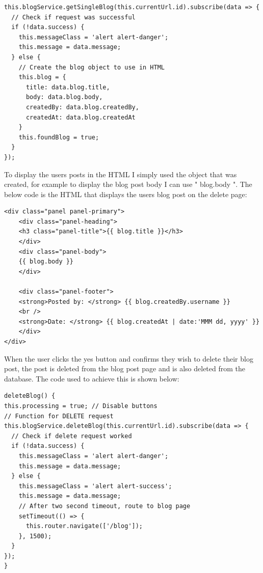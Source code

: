 \begin{lstlisting}
this.blogService.getSingleBlog(this.currentUrl.id).subscribe(data => {
  // Check if request was successful
  if (!data.success) {
    this.messageClass = 'alert alert-danger'; 
    this.message = data.message; 
  } else {
    // Create the blog object to use in HTML
    this.blog = {
      title: data.blog.title,
      body: data.blog.body,
      createdBy: data.blog.createdBy,
      createdAt: data.blog.createdAt
    }
    this.foundBlog = true;
  }
});
\end{lstlisting}

To display the users posts in the HTML I simply used the object that was created, for example to display the blog post body I can use "{{ blog.body }}". The below code is the HTML that displays the users blog post on the delete page:
\begin{lstlisting}
<div class="panel panel-primary">
    <div class="panel-heading">
    <h3 class="panel-title">{{ blog.title }}</h3>
    </div>
    <div class="panel-body">
    {{ blog.body }}
    </div>

    <div class="panel-footer">
    <strong>Posted by: </strong> {{ blog.createdBy.username }}
    <br />
    <strong>Date: </strong> {{ blog.createdAt | date:'MMM dd, yyyy' }}
    </div>
</div>
\end{lstlisting}

When the user clicks the yes button and confirms they wish to delete their blog post, the post is deleted from the blog post page and is also deleted from the database. The code used to achieve this is shown below:

\begin{lstlisting}
deleteBlog() {
this.processing = true; // Disable buttons
// Function for DELETE request
this.blogService.deleteBlog(this.currentUrl.id).subscribe(data => {
  // Check if delete request worked
  if (!data.success) {
    this.messageClass = 'alert alert-danger'; 
    this.message = data.message; 
  } else {
    this.messageClass = 'alert alert-success'; 
    this.message = data.message; 
    // After two second timeout, route to blog page
    setTimeout(() => {
      this.router.navigate(['/blog']);
    }, 1500);
  }
});
}
\end{lstlisting}

